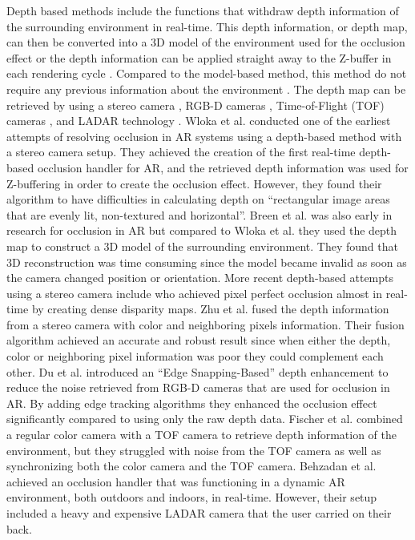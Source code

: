 Depth based methods include the functions that withdraw depth information of the surrounding environment in real-time. This depth information, or depth map, can then be converted into a 3D model of the environment used for the occlusion effect \cite{breen1996interactive} or the depth information can be applied straight away to the Z-buffer in each rendering cycle \cite{wloka1995resolving}. Compared to the model-based method, this method do not require any previous information about the environment \cite{shah2012occlusion}. The depth map can be retrieved by using a stereo camera \cite{breen1996interactive, wloka1995resolving, schmidt2002dense, zhu2010handling}, RGB-D cameras \cite{du2016edge}, Time-of-Flight (TOF) cameras \cite{fischer2007using}, and LADAR technology \cite{behzadan2010scalable}. Wloka et al. \cite{wloka1995resolving} conducted one of the earliest attempts of resolving occlusion in AR systems using a depth-based method with a stereo camera setup. They achieved the creation of the first real-time depth-based occlusion handler for AR, and the retrieved depth information was used for Z-buffering in order to create the occlusion effect. However, they found their algorithm to have difficulties in calculating depth on ``rectangular image areas that are evenly lit, non-textured and horizontal''. Breen et al. \cite{breen1996interactive} was also early in research for occlusion in AR but compared to Wloka et al. \cite{wloka1995resolving} they used the depth map to construct a 3D model of the surrounding environment. They found that 3D reconstruction was time consuming since the model became invalid as soon as the camera changed position or orientation. More recent depth-based attempts using a stereo camera include \cite{schmidt2002dense} who achieved pixel perfect occlusion almost in real-time by creating dense disparity maps. Zhu et al. \cite{zhu2010handling} fused the depth information from a stereo camera with color and neighboring pixels information. Their fusion algorithm achieved an accurate and robust result since when either the depth, color or neighboring pixel information was poor they could complement each other. Du et al. \cite{du2016edge} introduced an ``Edge Snapping-Based'' depth enhancement to reduce the noise retrieved from RGB-D cameras that are used for occlusion in AR. By adding edge tracking algorithms they enhanced the occlusion effect significantly compared to using only the raw depth data. Fischer et al. \cite{fischer2007using} combined a regular color camera with a TOF camera to retrieve depth information of the environment, but they struggled with noise from the TOF camera as well as synchronizing both the color camera and the TOF camera. Behzadan et al. \cite{behzadan2010scalable} achieved an occlusion handler that was functioning in a dynamic AR environment, both outdoors and indoors, in real-time. However, their setup included a heavy and expensive LADAR camera that the user carried on their back.

